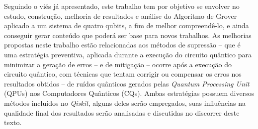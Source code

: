 Seguindo o vi\'{e}s j\'{a} apresentado, este trabalho tem por objetivo se envolver no estudo, construç\~{a}o, melhoria de resultados e an\'{a}lise do Algoritmo de Grover aplicado a um sistema de quatro qubits, a fim de melhor compreend\^{e}-lo, e ainda conseguir gerar conteúdo que poder\'{a} ser base para novos trabalhos. As melhorias propostas neste trabalho est\~{a}o relacionadas aos m\'{e}todos de supress\~{a}o – que \'{e} uma estrat\'{e}gia preventiva, aplicada durante a execuç\~{a}o do circuito qu\^{a}ntico para minimizar a geraç\~{a}o de erros – e de mitigaç\~{a}o – ocorre após a execuç\~{a}o do circuito qu\^{a}ntico, com t\'{e}cnicas que tentam corrigir ou compensar os erros nos resultados obtidos – de ruídos qu\^{a}nticos gerados pelas \textit{Quantum Processing Unit} (QPUs) nos Computadores Qu\^{a}nticos (CQs). Ambas estrat\'{e}gias possuem diversos m\'{e}todos incluídos no \emph{Qiskit}, alguns deles ser\~{a}o empregados, suas influ\^{e}ncias na qualidade final dos resultados ser\~{a}o analisadas e discutidas no discorrer deste texto.
